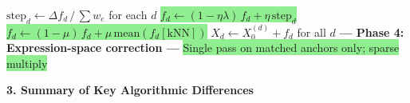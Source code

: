 \documentclass[8pt]{article}
\begin{document}
\begin{tcolorbox}
\begin{algorithmic}[1]
    \EndFor
    \State $\text{step}_d \gets \Delta f_d \,/\, \sum w_e$ for each $d$
    \State \colorbox{lightgreen}{$f_d \gets (1 - \eta\lambda) \, f_d + \eta \, \text{step}_d$} 
    \State \colorbox{lightgreen}{$f_d \gets (1 - \mu) \, f_d + \mu \, \text{mean}(f_d[\text{kNN}])$} 
\EndFor
\State $X_d \gets X_0^{(d)} + f_d$ for all $d$ 
\State \textbf{--- Phase 4: Expression-space correction ---}
\State \colorbox{lightgreen}{Single pass on matched anchors only; sparse multiply} \Comment{\textcolor{added}{No dense toarray}}
\end{algorithmic}
\end{tcolorbox}

\newpage


{\large\bfseries 3. Summary of Key Algorithmic Differences}

\vspace{3pt}
\end{document}
